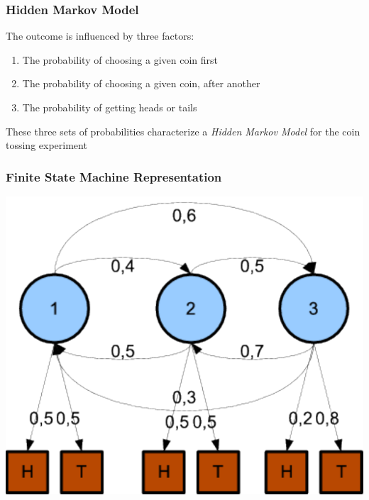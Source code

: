 \documentclass{beamer}
\begin{document}

\begin{frame} \frametitle{Hidden Markov Model}

  The outcome is influenced by three factors:
  \begin{enumerate}
  \item The probability of choosing a given coin first
  \item The probability of choosing a given coin, after another
  \item The probability of getting heads or tails
  \end{enumerate}

  \begin{block}{}
    These three sets of probabilities characterize a \emph{Hidden Markov Model}
    for the coin tossing experiment
  \end{block}
  
\end{frame}


\begin{frame} \frametitle{Finite State Machine Representation}

  \centering
  \includegraphics[width=.8\linewidth]{hmm-coins}
  
\end{frame}

\end{document}
